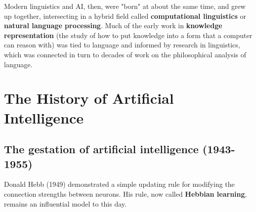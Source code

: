 \documentclass[a4paper,10pt,twoside]{book}
\begin{document}
Modern linguistics and AI, then, were "born" at about the same time, and grew up together, intersecting in a hybrid field called \textbf{computational linguistics} or \textbf{natural language processing}. Much of the early work in \textbf{knowledge representation} (the study of how to put knowledge into a form that a computer can reason with) was tied to language and informed by research in linguistics, which was connected in turn to decades of work on the philosophical analysis of language.

\section{The History of Artificial Intelligence}
\subsection{The gestation of artificial intelligence (1943-1955)}

Donald Hebb (1949) demonstrated a simple updating rule for modifying the connection strengths between neurons. His rule, now called \textbf{Hebbian learning}, remains an influential model to this day.

\end{document}
